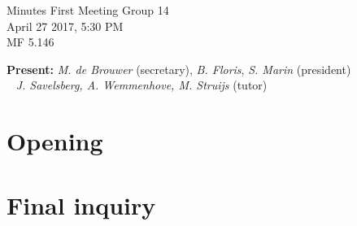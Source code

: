 \documentclass[a4paper,twoside,11pt]{article}
\title{}
\date{}
\begin{document}

\begin{center}
\Huge{Minutes First Meeting Group 14}
\\\vspace*{2mm}
\Large{April 27 2017, 5:30 PM}
\\\vspace*{2mm}
\large{MF 5.146}
\\
		\end{center}

		\textbf{Present:} \textit{M. de Brouwer} (secretary), \textit{B. Floris}, \textit{S. Marin} (president)
\\\indent\qquad\,\,\,\,\,\qquad\quad \textit{J. Savelsberg, A. Wemmenhove, M. Struijs} (tutor)

	\section{Opening}

	\section{Final inquiry}

	
\end{document}
